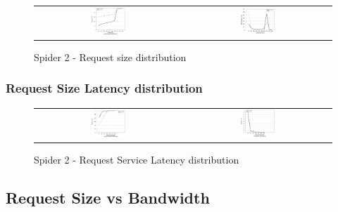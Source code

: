 \begin{figure}[!t]
\centering
\begin{tabular}{cc}
{\includegraphics[width=0.24\textwidth]{./figs/spider2-reqSizeCDF.eps}}&
{\includegraphics[width=0.24\textwidth]{./figs/spider2-reqSizePDF.eps}}\\
\end{tabular}
\vspace{-0.1in}
\centering
\caption{Spider 2 - Request size distribution}
\label{fig:spider1-reqsizedist}
\end{figure}



\subsubsection{Request Size Latency distribution}

\begin{figure}[!t]
\centering
\begin{tabular}{cc}
{\includegraphics[width=0.24\textwidth]{./figs/spider2-reqLatCDF.eps}}&
{\includegraphics[width=0.24\textwidth]{./figs/spider2-reqLatPDF.eps}}\\
\end{tabular}
\vspace{-0.1in}
\centering
\caption{Spider 2 - Request Service Latency distribution}
\label{fig:spider1-reqLat}
\end{figure}




\subsection{Request Size vs Bandwidth}

 
